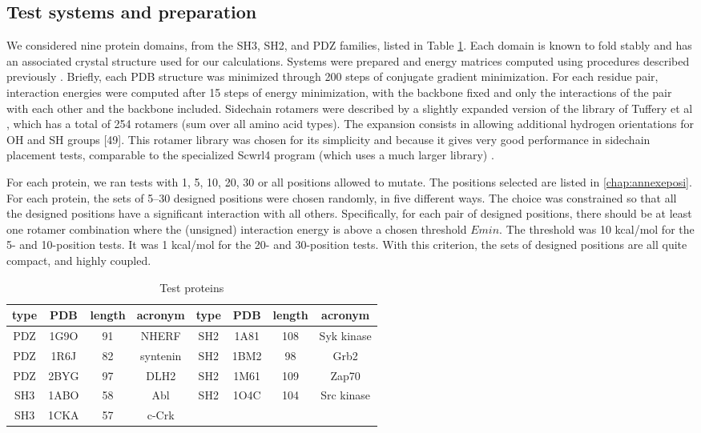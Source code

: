 \subsection{Test systems and preparation}
We considered nine protein domains, from the SH3, SH2, and PDZ families, listed in Table \ref{tab:proteins}.
Each domain is known to fold stably and has an associated crystal structure used for our calculations. Systems were prepared and energy matrices computed using procedures described previously \cite{Schmidt09,Schmidt10}.
Briefly, each PDB structure was minimized through 200 steps of conjugate gradient minimization. For each residue pair, interaction energies were computed after 15 steps of energy minimization, with the backbone fixed and only the interactions of the pair with each other and the backbone included. Sidechain rotamers were described by a slightly expanded version of the library of Tuffery et al \cite{Tuffery91}, which has a total of 254 rotamers (sum over all amino acid types).
The expansion consists in allowing additional hydrogen orientations for OH and SH groups [49].
This rotamer library was chosen for its simplicity and because it gives very good performance in sidechain placement tests, comparable to the specialized Scwrl4 program (which uses a much larger library) \cite{Krivov09,Gaillard16}.

For each protein, we ran tests with 1, 5, 10, 20, 30 or all positions allowed to mutate. The positions selected are listed in \ref{chap:annexeposi}. For each protein, the sets of 5–30 designed positions were chosen randomly, in five different ways. The choice was constrained so that all the designed positions have a significant interaction with all others.
Specifically, for each pair of designed positions, there should be at least one rotamer combination where the (unsigned) interaction energy is above a chosen threshold $Emin$. The threshold was 10 kcal/mol for the 5- and 10-position tests.
It was 1 kcal/mol for the 20- and 30-position tests. With this criterion, the sets of designed positions are all quite compact, and highly coupled.


\begin{table}[H]                            
\caption{Test proteins}
\label{tab:proteins}                      
\begin{center}
\begin{tabular}{cccccccc} \hline \hline  
type & PDB  & length & acronym  & type & PDB  & length & acronym \\ \hline
PDZ  & 1G9O &  91    & NHERF    & SH2  & 1A81 & 108    & Syk kinase \\ 
PDZ  & 1R6J &  82    & syntenin & SH2  & 1BM2 &  98    & Grb2       \\
PDZ  & 2BYG &  97    & DLH2     & SH2  & 1M61 & 109    & Zap70      \\
SH3  & 1ABO &  58    & Abl      & SH2  & 1O4C & 104    & Src kinase \\
SH3  & 1CKA &  57    & c-Crk    &      &      &        &     \\ \hline
\end{tabular}
\end{center}
\end{table}


